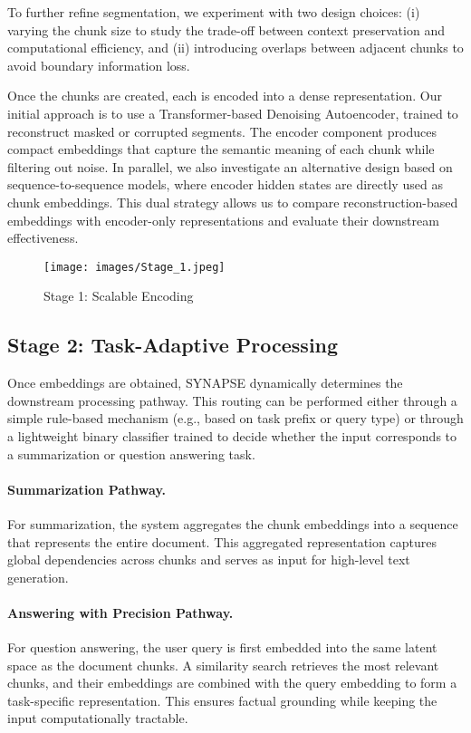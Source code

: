 \documentclass[11pt]{article}
\begin{document}
To further refine segmentation, we experiment with two design choices: (i) varying the chunk size to study the trade-off between context preservation and computational efficiency, and (ii) introducing overlaps between adjacent chunks to avoid boundary information loss.

Once the chunks are created, each is encoded into a dense representation. Our initial approach is to use a Transformer-based Denoising Autoencoder, trained to reconstruct masked or corrupted segments. The encoder component produces compact embeddings that capture the semantic meaning of each chunk while filtering out noise. In parallel, we also investigate an alternative design based on sequence-to-sequence models, where encoder hidden states are directly used as chunk embeddings. This dual strategy allows us to compare reconstruction-based embeddings with encoder-only representations and evaluate their downstream effectiveness.

\begin{figure}[H]
    \centering
    \texttt{[image: images/Stage\_1.jpeg]}
    \caption*{Stage 1: Scalable Encoding}
    \label{fig:stage1}
\end{figure}

\subsection{Stage 2: Task-Adaptive Processing}
Once embeddings are obtained, SYNAPSE dynamically determines the downstream processing pathway. This routing can be performed either through a simple rule-based mechanism (e.g., based on task prefix or query type) or through a lightweight binary classifier trained to decide whether the input corresponds to a summarization or question answering task.

\paragraph{Summarization Pathway.} For summarization, the system aggregates the chunk embeddings into a sequence that represents the entire document. This aggregated representation captures global dependencies across chunks and serves as input for high-level text generation.

\paragraph{Answering with Precision Pathway.} For question answering, the user query is first embedded into the same latent space as the document chunks. A similarity search retrieves the most relevant chunks, and their embeddings are combined with the query embedding to form a task-specific representation. This ensures factual grounding while keeping the input computationally tractable.
\end{document}

